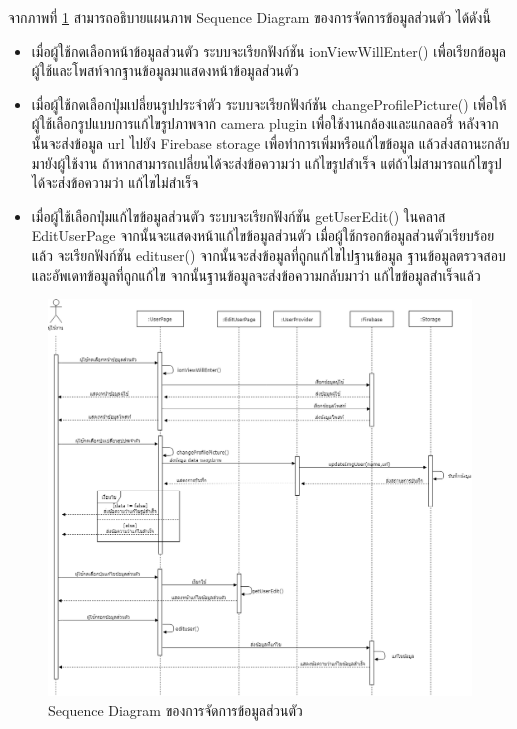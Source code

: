 	จากภาพที่ \ref{Fig:Sequence-edituser} สามารถอธิบายแผนภาพ Sequence Diagram ของการจัดการข้อมูลส่วนตัว ได้ดังนี้ 
	\begin{itemize}
		\item เมื่อผู้ใช้กดเลือกหน้าข้อมูลส่วนตัว ระบบจะเรียกฟังก์ชัน ionViewWillEnter() เพื่อเรียกข้อมูลผู้ใช้และโพสท์จากฐานข้อมูลมาแสดงหน้าข้อมูลส่วนตัว
		\item เมื่อผู้ใช้กดเลือกปุ่มเปลี่ยนรูปประจำตัว ระบบจะเรียกฟังก์ชัน changeProfilePicture() เพื่อให้ผู้ใช้เลือกรูปแบบการแก้ไขรูปภาพจาก camera plugin เพื่อใช้งานกล้องและแกลลอรี่ 
		หลังจากนั้นจะส่งข้อมูล url ไปยัง Firebase storage เพื่อทำการเพิ่มหรือแก้ไขข้อมูล แล้วส่งสถานะกลับมายังผู้ใช้งาน ถ้าหากสามารถเปลี่ยนได้จะส่งข้อความว่า แก้ไขรูปสำเร็จ 
		แต่ถ้าไม่สามารถแก้ไขรูปได้จะส่งข้อความว่า แก้ไขไม่สำเร็จ 
		\item เมื่อผู้ใช้เลือกปุ่มแก้ไขข้อมูลส่วนตัว ระบบจะเรียกฟังก์ชัน getUserEdit() ในคลาส EditUserPage จากนั้นจะแสดงหน้าแก้ไขข้อมูลส่วนตัว เมื่อผู้ใช้กรอกข้อมูลส่วนตัวเรียบร้อยแล้ว จะเรียกฟังก์ชัน edituser() 
		จากนั้นจะส่งข้อมูลที่ถูกแก้ไขไปฐานข้อมูล ฐานข้อมูลตรวจสอบและอัพเดทข้อมูลที่ถูกแก้ไข จากนั้นฐานข้อมูลจะส่งข้อความกลับมาว่า แก้ไขข้อมูลสำเร็จแล้ว
		\end{itemize}
\newpage
	\begin{figure}[H]
		\centering
		\includegraphics[width=1.0\columnwidth]
		{Figures/3/Sequence/edituser}
		\caption{Sequence Diagram ของการจัดการข้อมูลส่วนตัว}
		\label{Fig:Sequence-edituser}
	\end{figure}
	\newpage	

